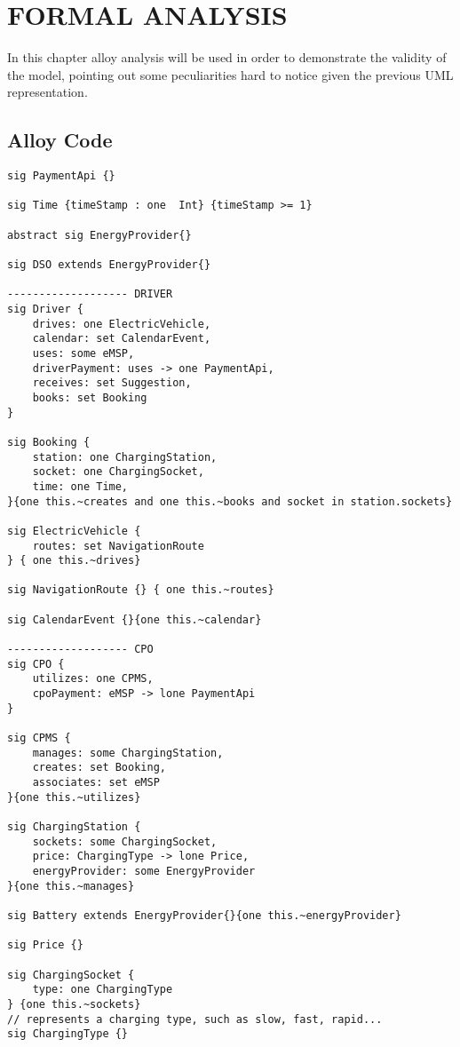 \chapter{FORMAL ANALYSIS}
\label{ch:formalAnalysis}%
In this chapter alloy analysis will be used in order to demonstrate the validity of the model, pointing out some peculiarities hard to notice given the previous UML representation.
\section{Alloy Code}
\label{sec:alloyCode}
\begin{lstlisting}[language=alloy]
sig PaymentApi {}

sig Time {timeStamp : one  Int} {timeStamp >= 1}

abstract sig EnergyProvider{}

sig DSO extends EnergyProvider{}

------------------- DRIVER 
sig Driver {
    drives: one ElectricVehicle,
    calendar: set CalendarEvent, 
    uses: some eMSP,
    driverPayment: uses -> one PaymentApi,
    receives: set Suggestion,
    books: set Booking
}

sig Booking {
    station: one ChargingStation,
    socket: one ChargingSocket,
    time: one Time,
}{one this.~creates and one this.~books and socket in station.sockets}

sig ElectricVehicle {
    routes: set NavigationRoute
} { one this.~drives}

sig NavigationRoute {} { one this.~routes}

sig CalendarEvent {}{one this.~calendar}

------------------- CPO 
sig CPO {
    utilizes: one CPMS,
    cpoPayment: eMSP -> lone PaymentApi
}

sig CPMS {
    manages: some ChargingStation,
    creates: set Booking,
    associates: set eMSP
}{one this.~utilizes}

sig ChargingStation {
    sockets: some ChargingSocket,
    price: ChargingType -> lone Price,
    energyProvider: some EnergyProvider
}{one this.~manages}

sig Battery extends EnergyProvider{}{one this.~energyProvider}

sig Price {} 

sig ChargingSocket {
    type: one ChargingType
} {one this.~sockets}
// represents a charging type, such as slow, fast, rapid...
sig ChargingType {}


\end{lstlisting}
